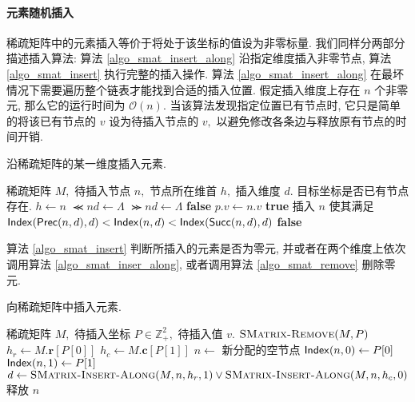 \paragraph{元素随机插入} 稀疏矩阵中的元素插入等价于将处于该坐标的值设为非零标量. 我们同样分两部分描述插入算法: 算法 \ref{algo_smat_insert_along} 沿指定维度插入非零节点, 算法 \ref{algo_smat_insert} 执行完整的插入操作. 算法 \ref{algo_smat_insert_along} 在最坏情况下需要遍历整个链表才能找到合适的插入位置. 假定插入维度上存在 $n$ 个非零元, 那么它的运行时间为 $\mathcal{O}(n).$ 当该算法发现指定位置已有节点时, 它只是简单的将该已有节点的 $v$ 设为待插入节点的 $v,$ 以避免修改各条边与释放原有节点的时间开销.
\begin{breakablealgorithm}
\caption{沿稀疏矩阵的某一维度插入元素.}
\label{algo_smat_insert_along}
\begin{algorithmic}[1]
\Require 稀疏矩阵 $M,$ 待插入节点 $n,$ 节点所在维首 $h,$ 插入维度 $d.$
\Ensure 目标坐标是否已有节点存在.
        \State $h \gets n$
        \State $\Prec{n}{d} \gets \Lambda$
        \State $\Succ{n}{d} \gets \Lambda$
        \State \Return \textbf{false}
    \EndIf
        \State $p.v \gets n.v$
        \State \Return \textbf{true}
    \EndIf
    \State 插入 $n$ 使其满足 $\mathsf{Index}(\mathsf{Prec}(n, d), d) < \mathsf{Index}(n, d) < \mathsf{Index}(\mathsf{Succ}(n, d), d)$
    \State \Return \textbf{false}
\EndFunction
\end{algorithmic}
\end{breakablealgorithm}

算法 \ref{algo_smat_insert} 判断所插入的元素是否为零元, 并或者在两个维度上依次调用算法 \ref{algo_smat_inser_along}, 或者调用算法 \ref{algo_smat_remove} 删除零元.
\begin{breakablealgorithm}
\caption{向稀疏矩阵中插入元素.}
\label{algo_smat_insert}
\begin{algorithmic}[1]
\Require 稀疏矩阵 $M,$ 待插入坐标 $P \in \mathbb{Z}_{+}^{2},$ 待插入值 $v.$
        \State $\textsc{SMatrix-Remove}(M, P)$
        \State \Return
    \EndIf
    \State $h_r \gets M.\bm{r}[P[0]]$
    \State $h_c \gets M.\bm{c}[P[1]]$
    \State $n \gets$ 新分配的空节点
    \State $\mathsf{Index}(n, 0) \gets P[0]$
    \State $\mathsf{Index}(n, 1) \gets P[1]$
    \State $d \gets \textsc{SMatrix-Insert-Along}(M, n, h_r, 1) \lor \textsc{SMatrix-Insert-Along}(M, n, h_c, 0)$
        \State 释放 $n$
    \EndIf
\EndProcedure
\end{algorithmic}
\end{breakablealgorithm}

